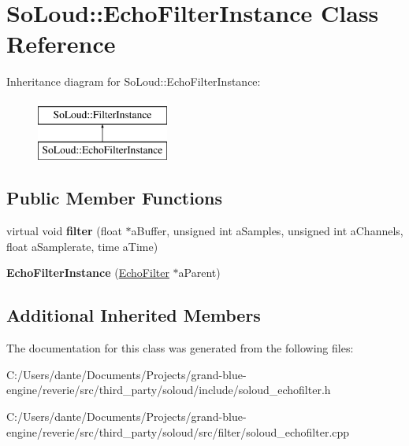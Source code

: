\hypertarget{class_so_loud_1_1_echo_filter_instance}{}\section{So\+Loud\+::Echo\+Filter\+Instance Class Reference}
\label{class_so_loud_1_1_echo_filter_instance}
Inheritance diagram for So\+Loud\+::Echo\+Filter\+Instance\+:\begin{figure}[H]
\begin{center}
\leavevmode
\includegraphics[height=2.000000cm]{class_so_loud_1_1_echo_filter_instance}
\end{center}
\end{figure}
\subsection*{Public Member Functions}
\begin{DoxyCompactItemize}
\item 
\mbox{\label{class_so_loud_1_1_echo_filter_instance_ad19b7cb1d53803bd66f6f9366d111c5a}} 
virtual void {\bfseries filter} (float $\ast$a\+Buffer, unsigned int a\+Samples, unsigned int a\+Channels, float a\+Samplerate, time a\+Time)
\item 
\mbox{\label{class_so_loud_1_1_echo_filter_instance_ab2584f4cbaa08c31555538a7a557ee70}} 
{\bfseries Echo\+Filter\+Instance} (\mbox{\hyperlink{class_so_loud_1_1_echo_filter}{Echo\+Filter}} $\ast$a\+Parent)
\end{DoxyCompactItemize}
\subsection*{Additional Inherited Members}


The documentation for this class was generated from the following files\+:\begin{DoxyCompactItemize}
\item 
C\+:/\+Users/dante/\+Documents/\+Projects/grand-\/blue-\/engine/reverie/src/third\+\_\+party/soloud/include/soloud\+\_\+echofilter.\+h\item 
C\+:/\+Users/dante/\+Documents/\+Projects/grand-\/blue-\/engine/reverie/src/third\+\_\+party/soloud/src/filter/soloud\+\_\+echofilter.\+cpp\end{DoxyCompactItemize}
